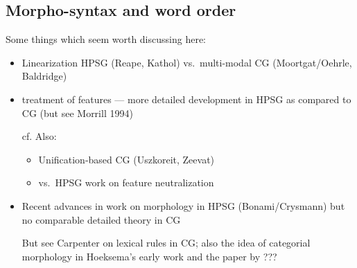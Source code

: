\documentclass[output=paper]{langsci/langscibook}
\begin{document}



\subsection{Morpho-syntax and word order \label{sec:morphology}}


\noindent
Some things which seem worth discussing here:

\begin{itemize}
 \item Linearization HPSG (Reape, Kathol) vs.\  multi-modal CG (Moortgat/Oehrle, Baldridge) 
\end{itemize}
\begin{itemize}
 \item treatment of features --- more detailed development in HPSG as
  compared to CG (but see Morrill 1994)
  
  cf. Also:
  \begin{itemize}
   \item Unification-based CG (Uszkoreit, Zeevat)
   \item \citet{BJ95,Bayer96} vs.\  HPSG work on feature neutralization  
  \end{itemize}
\end{itemize}
\begin{itemize}
 \item Recent advances in work on morphology in HPSG (Bonami/Crysmann)
  but no comparable detailed theory in CG
  
  But see  Carpenter on lexical rules in CG; also
  the idea of categorial morphology in Hoeksema's early work
  and the paper by ???
\end{itemize}
\end{document}

